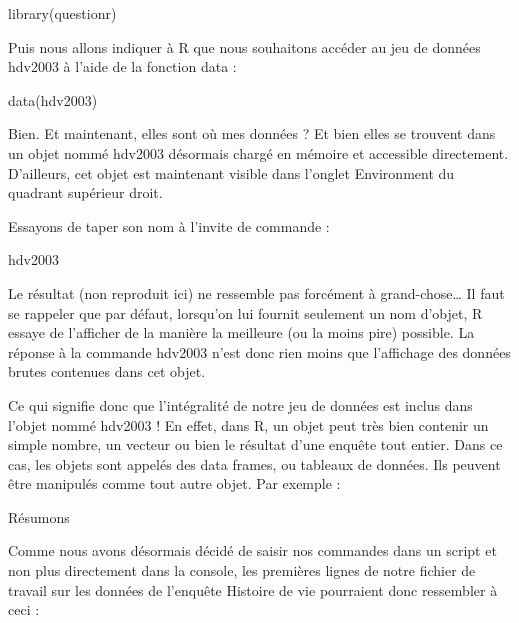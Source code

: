 \documentclass[
]{book}
\newenvironment{Shaded}{\begin{snugshade}}{\end{snugshade}}
\newcommand{\FunctionTok}[1]{\textcolor[rgb]{0.00,0.00,0.00}{#1}}
\newcommand{\NormalTok}[1]{#1}
\begin{document}
\begin{Shaded}
\begin{Highlighting}[]
\FunctionTok{library}\NormalTok{(questionr)}
\end{Highlighting}
\end{Shaded}

Puis nous allons indiquer à R que nous souhaitons accéder au jeu de données hdv2003 à l'aide de la fonction data :

\begin{Shaded}
\begin{Highlighting}[]
  \FunctionTok{data}\NormalTok{(hdv2003)}
\end{Highlighting}
\end{Shaded}

Bien. Et maintenant, elles sont où mes données ? Et bien elles se trouvent dans un objet nommé hdv2003 désormais chargé en mémoire et accessible directement. D'ailleurs, cet objet est maintenant visible dans l'onglet Environment du quadrant supérieur droit.

Essayons de taper son nom à l'invite de commande :

\begin{Shaded}
\begin{Highlighting}[]
\NormalTok{hdv2003}
\end{Highlighting}
\end{Shaded}

Le résultat (non reproduit ici) ne ressemble pas forcément à grand-chose\ldots{} Il faut se rappeler que par défaut, lorsqu'on lui fournit seulement un nom d'objet, R essaye de l'afficher de la manière la meilleure (ou la moins pire) possible. La réponse à la commande hdv2003 n'est donc rien moins que l'affichage des données brutes contenues dans cet objet.

Ce qui signifie donc que l'intégralité de notre jeu de données est inclus dans l'objet nommé hdv2003 ! En effet, dans R, un objet peut très bien contenir un simple nombre, un vecteur ou bien le résultat d'une enquête tout entier. Dans ce cas, les objets sont appelés des data frames, ou tableaux de données. Ils peuvent être manipulés comme tout autre objet. Par exemple :

Résumons

Comme nous avons désormais décidé de saisir nos commandes dans un script et non plus directement dans la console, les premières lignes de notre fichier de travail sur les données de l'enquête Histoire de vie pourraient donc ressembler à ceci :
\end{document}
